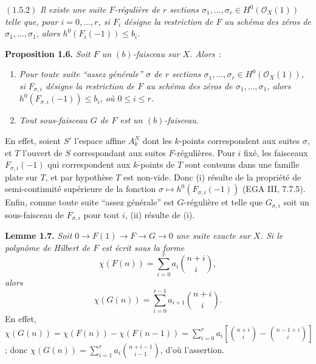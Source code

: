 \((1.5.2)\) \emph{Il existe une suite \(F\)-régulière de \(r\) sections \(\sigma_1,\ldots,\sigma_r\in H^0(\mathcal O_X(1))\) telle que, pour \(i=0,\ldots,r\), si \(F_i\) désigne la restriction de \(F\) au schéma des zéros de \(\sigma_1,\ldots,\sigma_1\), alors \(h^0(F_i(-1))\le b_i\).}

\textbf{Proposition 1.6.} \emph{Soit \(F\) un \((b)\)-faisceau sur \(X\). Alors}~:
\begin{enumerate}[label=(\roman*)]
\item \emph{Pour toute suite ``assez générale'' \(\sigma\) de \(r\) sections \(\sigma_1,\ldots,\sigma_r\in H^0(\mathcal O_X(1))\), si \(F_{\sigma,i}\) désigne la restriction de \(F\) au schéma des zéros de \(\sigma_1,\ldots,\sigma_1\), alors \(h^0(F_{\sigma,i}(-1))\le b_i\), où \(0\le i\le r\).}
\item \emph{Tout sous-faisceau \(G\) de \(F\) est un \((b)\)-faisceau.}
\end{enumerate}

En
effet, soient \(S'\) l'espace affine \(A_k^N\) dont les \(k\)-points correspondent aux suites \(\sigma\), et \(T\) l'ouvert de \(S\) correspondant aux suites \(F\)-régulières. Pour \(i\) fixé, les faisceaux \(F_{\sigma,i}(-1)\) qui correspondent aux \(k\)-points de \(T\) sont contenus dans une famille plate sur \(T\), et par hypothèse \(T\) est non-vide. Donc (i) résulte de la propriété de semi-continuité supérieure de la fonction $\sigma\longmapsto h^0(F_{\sigma,i}(-1))$ (EGA III, 7.7.5). Enfin, comme toute suite ``assez générale'' est \(G\)-régulière et telle que \(G_{\sigma,i}\) soit un sous-faisceau de \(F_{\sigma,i}\) pour tout \(i\), (ii) résulte de (i).

\textbf{Lemme 1.7.} \emph{Soit \(0\to F(1)\to F\to G\to0\) une suite exacte sur \(X\). Si le polynôme de Hilbert de \(F\) est écrit sous la forme}
\[
 \chi(F(n))=\sum_{i=0}^{r}a_i\binom{n+i}{i},
\]
\emph{alors}
\[
 \chi(G(n))=\sum_{i=0}^{r-1}a_{i+1}\binom{n+i}{i}.
\]
En effet, \(\chi(G(n))=\chi(F(n))-\chi(F(n-1))=\sum_{i=0}^{r}a_i\left[\binom{n+i}{i}-\binom{n-1+i}{i}\right]\); donc \(\chi(G(n))=\sum_{i=1}^{r}a_i\binom{n+i-1}{i-1}\), d'où l'assertion.

